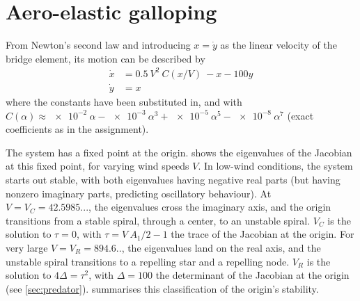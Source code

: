 \graphicspath{{../figures/4/}}


\chapter{Aero-elastic galloping}

From Newton's second law and introducing $x = \dot{y}$ as the linear velocity of the bridge element, its motion can be described by
%
\begin{align*}
\dot{x} &= 0.5\ V^2\ C(x/V)\ - x - 100y \\
\dot{y} &= x
\end{align*}
%
where the constants have been substituted in, and with $C(\alpha) \approx \num{e-2}\ \alpha - \num{e-3}\ \alpha^3 + \num{e-5}\ \alpha^5 - \num{e-8}\ \alpha^7$ (exact coefficients as in the assignment).


The system has a fixed point at the origin.  shows the eigenvalues of the Jacobian at this fixed point, for varying wind speeds $V$. In low-wind conditions, the system starts out stable, with both eigenvalues having negative real parts (but having nonzero imaginary parts, predicting oscillatory behaviour). At $V = V_C = 42.5985...$, the eigenvalues cross the imaginary axis, and the origin transitions from a stable spiral, through a center, to an unstable spiral. $V_C$ is the solution to $\tau = 0$, with $\tau = V\ A_1 / 2 - 1$ the trace of the Jacobian at the origin. For very large $V = V_R = 894.6..$, the eigenvalues land on the real axis, and the unstable spiral transitions to a repelling star and a repelling node. $V_R$ is the solution to $4 \Delta = \tau^2$, with $\Delta = 100$ the determinant of the Jacobian at the origin (see \cref{sec:predator}).  summarises this classification of the origin's stability.


